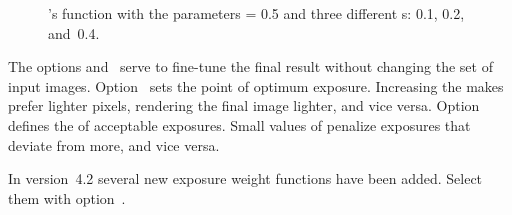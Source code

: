\begin{figure}[htbp]
  \ifreferencemanual\begin{maxipage}\fi
  \centering
  \ifreferencemanual\end{maxipage}\fi

  \caption[ weight function]{\App{}'s
     function with the parameters
     = 0.5 and three different s: 0.1,
    0.2, and~0.4.\label{fig:gaussian}}
\end{figure}


The options 
and~ serve to
fine-tune the final result without changing the set of input images.
Option~ sets the point of optimum exposure.
Increasing the  makes \App{} prefer lighter pixels,
rendering the final image lighter, and vice versa.
Option~ defines the  of
acceptable exposures.  Small values of  penalize
exposures that deviate from  more, and vice versa.

In \App{} version~4.2 several new exposure weight functions have been
added.  Select them with
option~.


